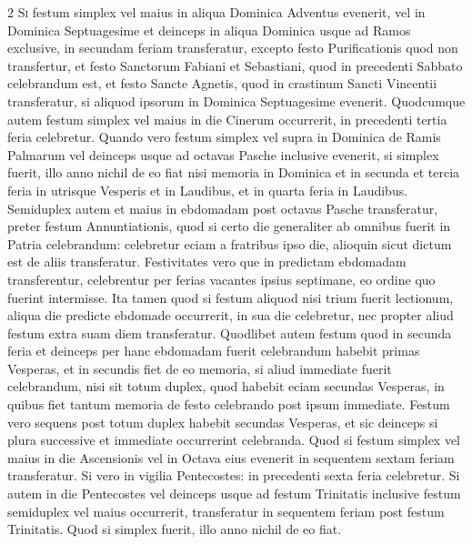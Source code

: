 \begin{multicols*}{2}
{\color{Red} }
\lettrine[lines=2]{\zallmancaps \color{Red} S}{i} festum simplex vel maius in aliqua Dominica Adventus evenerit, vel in Dominica Septuagesime et deinceps in aliqua Dominica usque ad Ramos exclusive, in secundam feriam transferatur, excepto festo Purificationis quod non transfertur, et festo Sanctorum Fabiani et Sebastiani, quod in precedenti Sabbato celebrandum est, et festo Sancte Agnetis, quod in crastinum Sancti Vincentii transferatur, si aliquod ipsorum in Dominica Septuagesime evenerit.
Quodcumque autem festum simplex vel maius in die Cinerum occurrerit, in precedenti tertia feria celebretur.
Quando vero festum simplex vel supra in Dominica de Ramis Palmarum vel deinceps usque ad octavas Pasche inclusive evenerit, si simplex fuerit, illo anno nichil de eo fiat nisi memoria in Dominica et in secunda et tercia feria in utrisque Vesperis et in Laudibus, et in quarta feria in Laudibus. Semiduplex autem et maius in ebdomadam post octavas Pasche transferatur, preter festum Annuntiationis, quod si certo die generaliter ab omnibus fuerit in Patria celebrandum: celebretur eciam a fratribus ipso die, alioquin sicut dictum est de aliis transferatur.
Festivitates vero que in predictam ebdomadam transferentur, celebrentur per ferias vacantes ipsius septimane, eo ordine quo fuerint intermisse. Ita tamen quod si festum aliquod nisi trium fuerit lectionum, aliqua die predicte ebdomade occurrerit, in sua die celebretur, nec propter aliud festum extra suam diem transferatur.
Quodlibet autem festum quod in secunda feria et deinceps per hanc ebdomadam fuerit celebrandum habebit primas Vesperas, et in secundis fiet de eo memoria, si aliud immediate fuerit celebrandum, nisi sit totum duplex, quod habebit eciam secundas Vesperas, in quibus fiet tantum memoria de festo celebrando post ipsum immediate. Festum vero sequens post totum duplex habebit secundas Vesperas, et sic deinceps si plura successive et immediate occurrerint celebranda.
Quod si festum simplex vel maius in die Ascensionis vel in Octava eius evenerit in sequentem sextam feriam transferatur. Si vero in vigilia Pentecostes: in precedenti sexta feria celebretur. Si autem in die Pentecostes vel deinceps usque ad festum Trinitatis inclusive festum semiduplex vel maius occurrerit, transferatur in sequentem feriam post festum Trinitatis. Quod si simplex fuerit, illo anno nichil de eo fiat.


\end{multicols*}
